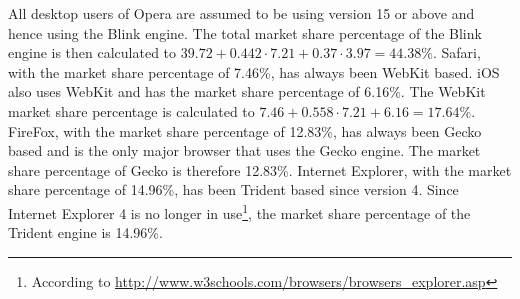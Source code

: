 \documentclass[a4paper,11pt]{kth-mag}
\begin{document}
          All desktop users of Opera are assumed to be using version 15 or above and hence using the Blink engine.
          The total market share percentage of the Blink engine is then calculated to $39.72 + 0.442\cdot7.21 + 0.37\cdot3.97 = 44.38\%$.
          Safari, with the market share percentage of 7.46\%, has always been WebKit based.
          iOS also uses WebKit and has the market share percentage of 6.16\%.
          The WebKit market share percentage is calculated to $7.46 + 0.558\cdot7.21 + 6.16 = 17.64\%$.
          FireFox, with the market share percentage of 12.83\%, has always been Gecko based and is the only major browser that uses the Gecko engine.
          The market share percentage of Gecko is therefore 12.83\%.
          Internet Explorer, with the market share percentage of 14.96\%, has been Trident based since version 4.
          Since Internet Explorer 4 is no longer in use\footnote{According to \url{http://www.w3schools.com/browsers/browsers_explorer.asp}}, the market share percentage of the Trident engine is 14.96\%.
\end{document}
